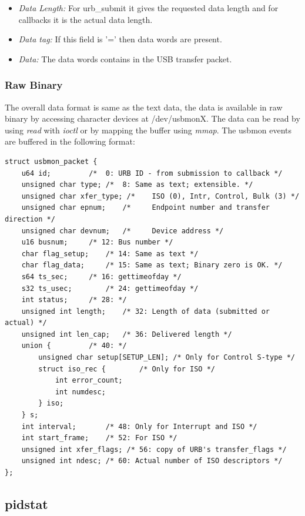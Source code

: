 \begin{itemize}
\item{\textit{Data Length:} For urb\_submit it gives the requested data length and for callbacks it is the actual data length.}

\item{\textit{Data tag:} If this field is '=' then data words are present.}

\item{\textit{Data:} The data words contains in the USB transfer packet.}
\end{itemize}

\subsubsection{Raw Binary}
The overall data format is same as the text data, the data is available in raw binary by accessing character devices at /dev/usbmonX. The data can be read by using \textit{read} with \textit{ioctl} or by mapping the buffer using \textit{mmap}. The usbmon events are buffered in the following format:

\begingroup
\centering\scriptsize\begin{lstlisting}
struct usbmon_packet {
	u64 id;			/*  0: URB ID - from submission to callback */
	unsigned char type;	/*  8: Same as text; extensible. */
	unsigned char xfer_type; /*    ISO (0), Intr, Control, Bulk (3) */
	unsigned char epnum;	/*     Endpoint number and transfer direction */
	unsigned char devnum;	/*     Device address */
	u16 busnum;		/* 12: Bus number */
	char flag_setup;	/* 14: Same as text */
	char flag_data;		/* 15: Same as text; Binary zero is OK. */
	s64 ts_sec;		/* 16: gettimeofday */
	s32 ts_usec;		/* 24: gettimeofday */
	int status;		/* 28: */
	unsigned int length;	/* 32: Length of data (submitted or actual) */
	unsigned int len_cap;	/* 36: Delivered length */
	union {			/* 40: */
		unsigned char setup[SETUP_LEN];	/* Only for Control S-type */
		struct iso_rec {		/* Only for ISO */
			int error_count;
			int numdesc;
		} iso;
	} s;
	int interval;		/* 48: Only for Interrupt and ISO */
	int start_frame;	/* 52: For ISO */
	unsigned int xfer_flags; /* 56: copy of URB's transfer_flags */
	unsigned int ndesc;	/* 60: Actual number of ISO descriptors */
};	
\end{lstlisting}
\endgroup


\subsection{pidstat}